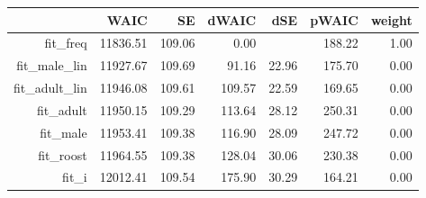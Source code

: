 \begin{table}[ht]
\centering
\begin{tabular}{rrrrrrr}
  \hline
 & WAIC & SE & dWAIC & dSE & pWAIC & weight \\ 
  \hline
fit\_freq & 11836.51 & 109.06 & 0.00 &  & 188.22 & 1.00 \\ 
  fit\_male\_lin & 11927.67 & 109.69 & 91.16 & 22.96 & 175.70 & 0.00 \\ 
  fit\_adult\_lin & 11946.08 & 109.61 & 109.57 & 22.59 & 169.65 & 0.00 \\ 
  fit\_adult & 11950.15 & 109.29 & 113.64 & 28.12 & 250.31 & 0.00 \\ 
  fit\_male & 11953.41 & 109.38 & 116.90 & 28.09 & 247.72 & 0.00 \\ 
  fit\_roost & 11964.55 & 109.38 & 128.04 & 30.06 & 230.38 & 0.00 \\ 
  fit\_i & 12012.41 & 109.54 & 175.90 & 30.29 & 164.21 & 0.00 \\ 
   \hline
\end{tabular}
\end{table}
